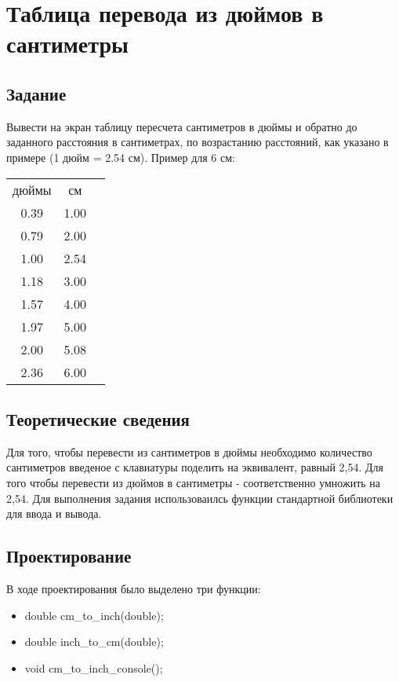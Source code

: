 \documentclass[12pt,a4paper]{report}
\begin{document}
\section{Таблица перевода из дюймов в сантиметры}
\subsection{Задание}
\hspace{\parindent}
Вывести на экран таблицу пересчета сантиметров в дюймы и обратно до заданного расстояния в сантиметрах, по возрастанию расстояний, как указано в примере (1 дюйм = 2.54 см). Пример для 6 см:
	
\begin{center}
\begin{tabular}{ccc}
	дюймы  &  см \\
	0.39 &  1.00 \\
	0.79 &  2.00 \\
	1.00 &  2.54 \\
	1.18 &  3.00 \\
	1.57 &  4.00 \\
	1.97 &  5.00 \\
	2.00 &  5.08 \\
	2.36 &  6.00\\
\end{tabular}
\end{center}	
	
\subsection{Теоретические сведения}
\hspace{\parindent}
Для того, чтобы перевести из сантиметров в дюймы необходимо количество сантиметров введеное с клавиатуры поделить на эквивалент, равный 2,54. Для того чтобы перевести из дюймов в сантиметры - соответственно умножить на 2,54.
	Для выполнения задания использоваилсь функции стандартной библиотеки для ввода и вывода.
	
\subsection{Проектирование}
\hspace{\parindent}
В ходе проектирования было выделено три функции:

\begin{itemize}
\item double cm\_to\_inch(double);
\item double inch\_to\_cm(double);
\item void cm\_to\_inch\_console();
\end{itemize}
\end{document}
